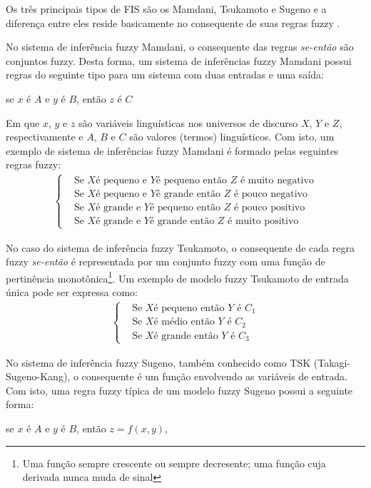 Os três principais tipos de FIS são os Mamdani, Tsukamoto e Sugeno e a diferença entre eles reside basicamente no consequente de suas regras fuzzy \cite[p.~74]{Jang1997}.

No sistema de inferência fuzzy Mamdani, o consequente das regras \textit{se-então} são conjuntos fuzzy. Desta forma, um sistema de inferências fuzzy Mamdani possui regras do seguinte tipo para um sistema com duas entradas e uma saída:
\begin{center}
se $x$ é $A$ e $y$ é $B$, então $z$ é $C$
\end{center}

Em que $x$, $y$ e $z$ são variáveis linguísticas nos universos de discurso $X$, $Y$ e $Z$, respectivamente e $A$, $B$ e $C$ são valores (termos) linguísticos. Com isto, um exemplo de sistema de inferências fuzzy Mamdani é formado pelas seguintes regras fuzzy:
\begin{align*}
\begin{cases}
&\mbox{Se }X  \mbox{é pequeno e } Y \mbox{é pequeno então } Z \mbox{ é muito negativo} \\
&\mbox{Se }X  \mbox{é pequeno e } Y \mbox{é grande então } Z \mbox{ é pouco negativo} \\
&\mbox{Se }X  \mbox{é grande e } Y \mbox{é pequeno então } Z \mbox{ é pouco positivo} \\
&\mbox{Se }X  \mbox{é grande e } Y \mbox{é grande então } Z \mbox{ é muito positivo} 
\end{cases}
\end{align*}

No caso do sistema de inferência fuzzy Tsukamoto, o consequente de cada regra fuzzy \textit{se-então} é representada por um conjunto fuzzy com uma função de pertinência monotônica\footnote{Uma função sempre crescente ou sempre decresente; uma função cuja derivada nunca muda de sinal}. Um exemplo de modelo fuzzy Tsukamoto de entrada única pode ser expressa como:
\begin{align*}
\begin{cases}
&\mbox{Se }X  \mbox{é pequeno então } Y \mbox{ é } C_1\\
&\mbox{Se }X  \mbox{é médio então } Y \mbox{ é } C_2\\
&\mbox{Se }X  \mbox{é grande então } Y \mbox{ é } C_3
\end{cases}
\end{align*}

No sistema de inferência fuzzy Sugeno, também conhecido como TSK (Takagi-Sugeno-Kang), o consequente é um função envolvendo as variáveis de entrada. Com isto, uma regra fuzzy típica de um modelo fuzzy Sugeno possui a seguinte forma:
\begin{center}
se $x$ é $A$ e $y$ é $B$, então $z = f(x,y)$,
\end{center}

